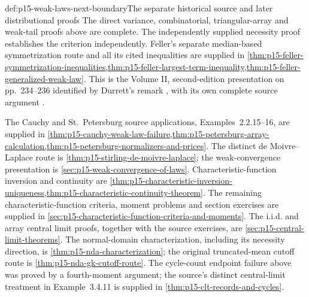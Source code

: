 \begin{proofboundary}{def:p15-weak-laws-next-boundary}{The separate historical source and later distributional proofs}
The direct variance, combinatorial, triangular-array and weak-tail
proofs above are complete. The independently supplied necessity proof
establishes the criterion independently. Feller's separate
median-based symmetrization route and all its cited inequalities are
supplied in \cref{thm:p15-feller-symmetrization-inequalities,thm:p15-feller-largest-term-inequality,thm:p15-feller-generalized-weak-law}.
This is the Volume II, second-edition presentation on pp.~234--236
identified by Durrett's remark \cite[p.~63]{DurrettPTEAuthor2019},
with its own complete source argument
\cite[ch.~VII, sec.~7]{Feller1971ProbabilityII}.

The Cauchy and St.~Petersburg source applications, Examples~2.2.15--16,
are supplied in \cref{thm:p15-cauchy-weak-law-failure,thm:p15-petersburg-array-calculation,thm:p15-petersburg-normalizers-and-prices}.
The distinct de Moivre--Laplace route is
\cref{thm:p15-stirling-de-moivre-laplace}; the weak-convergence
presentation is \cref{sec:p15-weak-convergence-of-laws}.
Characteristic-function inversion and continuity are
\cref{thm:p15-characteristic-inversion-uniqueness,thm:p15-characteristic-continuity-theorem}. The remaining
characteristic-function criteria, moment problems and section exercises
are supplied in \cref{sec:p15-characteristic-function-criteria-and-moments}.
The i.i.d. and array central limit proofs, together with the source exercises,
are \cref{sec:p15-central-limit-theorems}. The normal-domain
characterization, including its necessity direction, is
\cref{thm:p15-nda-characterization}; the original truncated-mean
cutoff route is \cref{thm:p15-nda-gk-cutoff-route}.
The cycle-count endpoint failure above was proved by a fourth-moment
argument; the source's distinct central-limit treatment in Example~3.4.11
is supplied in \cref{thm:p15-clt-records-and-cycles}.
\end{proofboundary}
